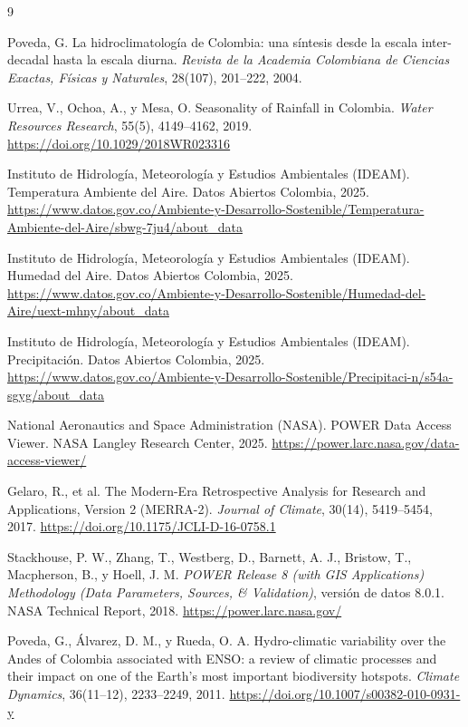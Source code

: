 \documentclass[12pt, a4paper]{article}
\begin{document}
\begin{thebibliography}{9}
	
	Poveda, G.
	La hidroclimatología de Colombia: una síntesis desde la escala inter-decadal
	hasta la escala diurna.
	\textit{Revista de la Academia Colombiana de Ciencias Exactas, Físicas y
		Naturales}, 28(107), 201--222, 2004.
	
	Urrea, V., Ochoa, A., y Mesa, O.
	Seasonality of Rainfall in Colombia.
	\textit{Water Resources Research}, 55(5), 4149--4162, 2019.
	\url{https://doi.org/10.1029/2018WR023316}
	
	Instituto de Hidrología, Meteorología y Estudios Ambientales (IDEAM).
	Temperatura Ambiente del Aire.
	Datos Abiertos Colombia, 2025.
	\url{https://www.datos.gov.co/Ambiente-y-Desarrollo-Sostenible/Temperatura-Ambiente-del-Aire/sbwg-7ju4/about_data}
	
	Instituto de Hidrología, Meteorología y Estudios Ambientales (IDEAM).
	Humedad del Aire.
	Datos Abiertos Colombia, 2025.
	\url{https://www.datos.gov.co/Ambiente-y-Desarrollo-Sostenible/Humedad-del-Aire/uext-mhny/about_data}
	
	Instituto de Hidrología, Meteorología y Estudios Ambientales (IDEAM).
	Precipitación.
	Datos Abiertos Colombia, 2025.
	\url{https://www.datos.gov.co/Ambiente-y-Desarrollo-Sostenible/Precipitaci-n/s54a-sgyg/about_data}
	
	National Aeronautics and Space Administration (NASA).
	POWER Data Access Viewer.
	NASA Langley Research Center, 2025.
	\url{https://power.larc.nasa.gov/data-access-viewer/}
	
	Gelaro, R., et al.
	The Modern-Era Retrospective Analysis for Research and Applications,
	Version 2 (MERRA-2).
	\textit{Journal of Climate}, 30(14), 5419--5454, 2017.
	\url{https://doi.org/10.1175/JCLI-D-16-0758.1}
	
	Stackhouse, P. W., Zhang, T., Westberg, D., Barnett, A. J., Bristow, T.,
	Macpherson, B., y Hoell, J. M.
	\textit{POWER Release 8 (with GIS Applications) Methodology (Data Parameters,
		Sources, \& Validation)}, versión de datos 8.0.1.
	NASA Technical Report, 2018.
	\url{https://power.larc.nasa.gov/}
	
	Poveda, G., Álvarez, D. M., y Rueda, O. A.
	Hydro-climatic variability over the Andes of Colombia associated with ENSO:
	a review of climatic processes and their impact on one of the Earth's most
	important biodiversity hotspots.
	\textit{Climate Dynamics}, 36(11--12), 2233--2249, 2011.
	\url{https://doi.org/10.1007/s00382-010-0931-y}
	

\end{thebibliography}
\end{document}
